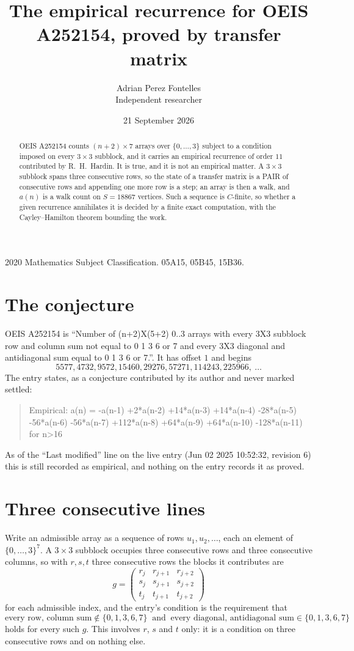\documentclass[11pt,a4paper]{article}
\title{The empirical recurrence for OEIS A252154, proved by transfer matrix}
\author{Adrian Perez Fontelles\\ \small Independent researcher}
\date{21 September 2026}
\theoremstyle{plain}
\theoremstyle{definition}
\begin{document}
\maketitle

\begin{abstract}
OEIS A252154 counts $(n+2)\times7$ arrays over $\{0,\dots,3\}$ subject to a condition imposed on
every $3\times3$ subblock, and it carries an empirical recurrence of order $11$
contributed by R.~H.~Hardin. It is true, and it is not an empirical matter. A $3\times3$
subblock spans three consecutive rows, so the state of a transfer matrix is a PAIR of
consecutive rows and appending one more row is a step; an array is then a walk, and
$a(n)$ is a walk count on $S=18867$ vertices. Such a sequence is $C$-finite, so whether a given
recurrence annihilates it is decided by a finite exact computation, with the Cayley--Hamilton
theorem bounding the work.
\end{abstract}

\noindent\small 2020 Mathematics Subject Classification. 05A15, 05B45, 15B36.\normalsize

\section{The conjecture}

OEIS A252154 is ``Number of (n+2)X(5+2) 0..3 arrays with every 3X3 subblock row and column sum not equal to 0 1 3 6 or 7 and every 3X3 diagonal and antidiagonal sum equal to 0 1 3 6 or 7.''. It has offset $1$ and begins
\[
5577, 4732, 9572, 15460, 29276, 57271, 114243, 225966,\ \dots
\]
The entry states, as a conjecture contributed by its author and never marked settled:
\begin{quote}
Empirical: a(n) = -a(n-1) +2*a(n-2) +14*a(n-3) +14*a(n-4) -28*a(n-5) -56*a(n-6) -56*a(n-7) +112*a(n-8) +64*a(n-9) +64*a(n-10) -128*a(n-11) for n>16
\end{quote}
As of the ``Last modified'' line on the live entry (Jun 02 2025 10:52:32, revision 6) this is still
recorded as empirical, and nothing on the entry records it as proved.

\section{Three consecutive lines}

Write an admissible array as a sequence of rows $u_1,u_2,\dots$, each an element of
$\{0,\dots,3\}^{7}$. A $3\times3$ subblock occupies three consecutive rows and
three consecutive columns, so with $r,s,t$ three consecutive rows the blocks it
contributes are
\[
g=\begin{pmatrix}r_j&r_{j+1}&r_{j+2}\\ s_j&s_{j+1}&s_{j+2}\\ t_j&t_{j+1}&t_{j+2}\end{pmatrix}
\]
for each admissible index, and the entry's condition is the requirement that
\[
\text{every row, column sum} \notin \{0,1,3,6,7\}\ \text{ and }\ \text{every diagonal, antidiagonal sum} \in \{0,1,3,6,7\}
\]
holds for every such $g$. This involves $r$, $s$ and $t$ only: it is a condition on
three consecutive rows and on nothing else.
\end{document}
